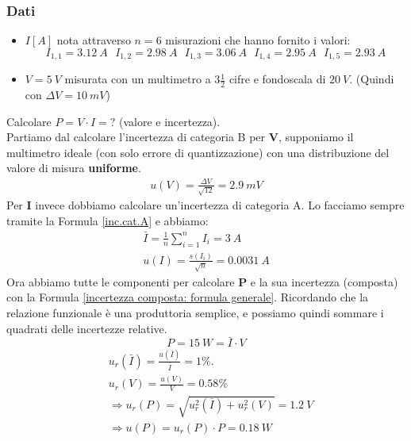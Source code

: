 \documentclass[a4paper,11pt]{report}
\begin{document}
\subsubsection*{Dati}
\begin{itemize}
  \item $I[A]$ nota attraverso $n = 6$ misurazioni che hanno fornito i valori:
  $$
      I_{1,1} = 3.12~A~~~I_{1,2} = 2.98~A~~~I_{1,3} = 3.06~A~~~I_{1,4} = 2.95~A~~~I_{1,5} = 2.93~A
  $$
  \item $V = 5~V$ misurata con un multimetro a $3\frac{1}{2}$ cifre e fondoscala di $20~V$. (Quindi con $\Delta V = 10~mV$)
\end{itemize}
Calcolare $P=V\cdot I = ?$ (valore e incertezza).\\

Partiamo dal calcolare l'incertezza di categoria B per \textbf{V}, supponiamo il multimetro ideale (con solo errore di quantizzazione) con una distribuzione del valore di misura \textbf{uniforme}.
\begin{align*}
  u(V) = \frac{\Delta V}{\sqrt{12}} = 2.9~mV
\end{align*}
Per \textbf{I} invece dobbiamo calcolare un'incertezza di categoria A. Lo facciamo sempre tramite la Formula \ref{inc.cat.A} e abbiamo:
\begin{align*}
  \bar{I} = \frac{1}{n}\sum^n_{i=1}I_i = 3~A \\
  u(I) = \frac{s(I_i)}{\sqrt{n}} = 0.0031~A
\end{align*}
Ora abbiamo tutte le componenti per calcolare \textbf{P} e la sua incertezza (composta) con la Formula \ref{incertezza composta: formula generale}. Ricordando che la relazione funzionale è una produttoria semplice, e possiamo quindi sommare i quadrati delle incertezze relative.
$$
  P = 15~W = \bar{I}\cdot V
$$
\begin{align*}
  &u_r(\bar{I}) = \frac{u(\bar{I})}{\bar{I}} = 1\%.\\
  &u_r(V) = \frac{u(V)}{V} = 0.58\%\\
  &\Rightarrow
  u_r(P) = \sqrt{u_r^2(\bar{I})+u_r^2(V)} = 1.2~V \\
  &\Rightarrow
  u(P) = u_r(P)\cdot P = 0.18~W
\end{align*}
\end{document}
